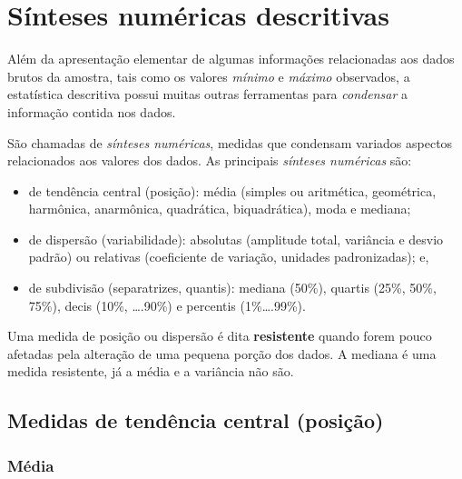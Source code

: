 \documentclass[
]{book}
\providecommand{\tightlist}{%
  \setlength{\itemsep}{0pt}\setlength{\parskip}{0pt}}
\begin{document}
\hypertarget{suxednteses-numuxe9ricas-descritivas}{%
\section{Sínteses numéricas descritivas}\label{suxednteses-numuxe9ricas-descritivas}}

\hfill\break

Além da apresentação elementar de algumas informações relacionadas aos dados brutos da amostra, tais como os valores \emph{mínimo} e \emph{máximo} observados, a estatística descritiva possui muitas outras ferramentas para \emph{condensar} a informação contida nos dados.

\hfill\break

São chamadas de \emph{sínteses numéricas}, medidas que condensam variados aspectos relacionados aos valores dos dados. As principais \emph{sínteses numéricas} são:

\hfill\break

\begin{itemize}
\tightlist
\item
  de tendência central (posição): média (simples ou aritmética, geométrica, harmônica, anarmônica, quadrática, biquadrática), moda e mediana;
\item
  de dispersão (variabilidade): absolutas (amplitude total, variância e desvio padrão) ou relativas (coeficiente de variação, unidades padronizadas); e,
\item
  de subdivisão (separatrizes, quantis): mediana (50\%), quartis (25\%, 50\%, 75\%), decis (10\%, \ldots.90\%) e percentis (1\%\ldots.99\%).
\end{itemize}

\hfill\break

Uma medida de posição ou dispersão é dita \textbf{resistente} quando forem pouco afetadas pela alteração de uma pequena porção dos dados. A mediana é uma medida resistente, já a média e a variância não são.

\hypertarget{medidas-de-tenduxeancia-central-posiuxe7uxe3o}{%
\subsection{Medidas de tendência central (posição)}\label{medidas-de-tenduxeancia-central-posiuxe7uxe3o}}

\hypertarget{muxe9dia}{%
\subsubsection{Média}\label{muxe9dia}}
\end{document}
